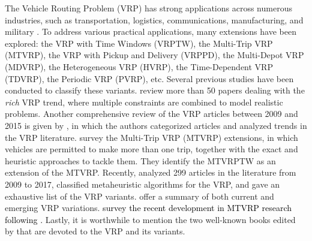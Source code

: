 \documentclass[11pt]{article}
\newcommand\add[1]{\textcolor{black}{#1}}
\begin{document}
The Vehicle Routing Problem (VRP) has strong applications across numerous industries, such as transportation, logistics, communications, manufacturing, and military  \citep{vidal2013heuristics}.  To address various practical applications, many extensions have been explored: the VRP with Time Windows (VRPTW), the Multi-Trip VRP (MTVRP), the VRP with Pickup and Delivery (VRPPD), the Multi-Depot VRP (MDVRP), the Heterogeneous VRP (HVRP), the Time-Dependent VRP (TDVRP), the Periodic VRP (PVRP), etc.  Several previous studies have been conducted to classify these variants.  \cite{caceres2014rich} review more than 50 papers dealing with the \textit{rich} VRP trend, where multiple constraints are combined to model realistic problems. Another comprehensive review of the VRP articles between 2009 and 2015 is given by \cite{braekers2016vehicle}, in which the authors categorized articles and analyzed trends in the VRP literature.  \cite{cattaruzza2016vehicle} survey the Multi-Trip VRP (MTVRP) extensions, in which vehicles are permitted to make more than one trip, together with the exact and heuristic approaches to tackle them.  They identify the MTVRPTW as an extension of the MTVRP.  Recently, \cite{elshaer2020taxonomic} analyzed 299 articles in the literature from 2009 to 2017, classified metaheuristic algorithms for the VRP, and gave an exhaustive list of the VRP variants.  \cite{vidal2020concise} offer a summary of both current and emerging VRP variations.  \add{\cite{mor2022vehicle} survey the recent development in MTVRP research following \cite{cattaruzza2016vehicle}.}  Lastly, it is worthwhile to mention the two well-known books edited by \cite{toth2002vehicle, toth2014vehicle} that are devoted to the VRP and its variants.
\newline
\end{document}
